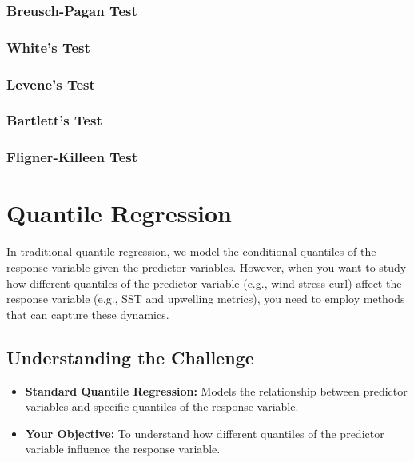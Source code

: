 \documentclass[
  letterpaper,
]{book}
\providecommand{\tightlist}{%
  \setlength{\itemsep}{0pt}\setlength{\parskip}{0pt}}\usepackage{longtable,booktabs,array}
\begin{document}
\subsection{Breusch-Pagan Test}\label{breusch-pagan-test}

\subsection{White's Test}\label{whites-test}

\subsection{Levene's Test}\label{levenes-test}

\subsection{Bartlett's Test}\label{bartletts-test}

\subsection{Fligner-Killeen Test}\label{fligner-killeen-test}

\chapter{Quantile Regression}\label{quantile-regression}

In traditional quantile regression, we model the conditional quantiles
of the response variable given the predictor variables. However, when
you want to study how different quantiles of the predictor variable
(e.g., wind stress curl) affect the response variable (e.g., SST and
upwelling metrics), you need to employ methods that can capture these
dynamics.

\section{Understanding the Challenge}\label{understanding-the-challenge}

\begin{itemize}
\tightlist
\item
  \textbf{Standard Quantile Regression:} Models the relationship between
  predictor variables and specific quantiles of the response variable.
\item
  \textbf{Your Objective:} To understand how different quantiles of the
  predictor variable influence the response variable.
\end{itemize}
\end{document}
